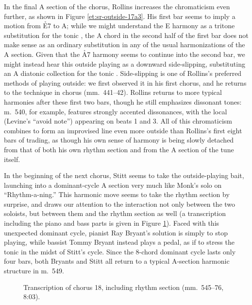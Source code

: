 In the final A section of the chorus, Rollins increases the chromaticism even
further, as shown in Figure \ref{et:sr-outside-17a3}. His first bar seems to
imply a motion from \h{E7} to A; while we might understand the E harmony as a
tritone substitution for the tonic \Bflat, the A chord in the second half of
the first bar does not make sense as an ordinary substitution in any of the
usual harmonizations of the A section. Given that the \h{A7} harmony seems to
continue into the second bar, we might instead hear this outside playing as a
downward side-slipping, substituting an A diatonic collection for the tonic
\Bflat. Side-slipping is one of Rollins's preferred methods of playing
outside: we first observed it in his first chorus, and he returns to the
technique in chorus  (mm.~441--42). Rollins returns to more
typical harmonies after these first two bars, though he still emphasizes
dissonant tones: m.~540, for example, features strongly accented dissonances,
with the local  (Levine's ``avoid note'') appearing on beats 1 and 3. All
of this chromaticism combines to form an improvised line even more outside
than Rollins's first eight bars of trading, as though his own sense of harmony
is being slowly detached from that of both his own rhythm section and from the
A section of the tune itself.

In the beginning of the next chorus, Stitt seems to take the outside-playing
bait, launching into a dominant-cycle A section very much like Monk's solo on
``Rhythm-a-ning.'' This harmonic move seems to take the rhythm section by
surprise, and draws our attention to the interaction not only between the two
soloists, but between them and the rhythm section as well (a transcription
including the piano and bass parts is given in Figure
\ref{et:rhythm-sect-c18}). Faced with this unexpected dominant cycle, pianist
Ray Bryant's solution is simply to stop playing, while bassist Tommy Bryant
instead plays a \Bflat pedal, as if to stress the tonic in the midst of
Stitt's cycle. Since the 8-chord dominant cycle lasts only four bars, both
Bryants and Stitt all return to a typical A-section harmonic structure in m.~549.

\begin{figure}[p]
  \caption[Transcription of chorus 18, including rhythm section.]{%
    Transcription of chorus 18, including rhythm section (mm.~545--76, 8:03).}
  \label{et:rhythm-sect-c18}
\end{figure}

